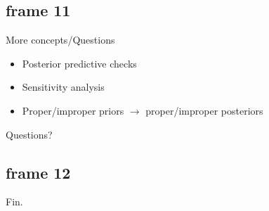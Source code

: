 \documentclass[xcolor=x11names,compress]{beamer}
\renewcommand{\(}{\begin{columns}}
\renewcommand{\)}{\end{columns}}
\newcommand{\<}[1]{\begin{column}{#1}}
\renewcommand{\>}{\end{column}}
\begin{document}
\subsection{frame 11}
\begin{frame}{More concepts/Questions}
\begin{itemize}
\item Posterior predictive checks
\pause \item Sensitivity analysis
\pause \item Proper/improper priors $\rightarrow$ proper/improper posteriors
\end{itemize}
\centering
\vspace{1cm}
\pause \Large{Questions?}
\end{frame}
\subsection{frame 12}
\begin{frame}
\centering
\Huge{Fin.}
\end{frame}
\end{document}

